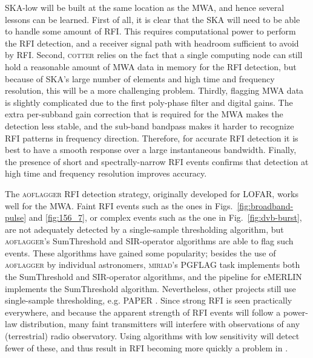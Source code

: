 \documentclass{pasa}
\newcommand{\editmark}[1]{{\color{red}{\textbf{#1}}}}
\begin{document}
SKA-low will be built at the same location as the MWA, and hence several lessons can be learned. First of all, it is clear that the SKA will need to be able to handle some amount of RFI. This requires computational power to perform the RFI detection, and a receiver signal path with headroom sufficient to avoid \editmark{gain compression} by RFI. Second, \textsc{cotter} relies on the fact that a single computing node can still hold a reasonable amount of MWA data in memory for the RFI detection, but because of SKA's large number of elements and high time and frequency resolution, this will be a more challenging problem. Thirdly, flagging MWA data is slightly complicated due to the first poly-phase filter and digital gains. The extra per-subband gain correction that is required for the MWA makes the detection less stable, and the sub-band bandpass makes it harder to recognize RFI patterns in frequency direction. Therefore, for accurate RFI detection it is best to have a smooth response over a large instantaneous bandwidth. Finally, the presence of short and spectrally-narrow RFI events confirms that detection at high time and frequency resolution improves accuracy.

The \textsc{aoflagger} RFI detection strategy, originally developed for LOFAR, works well for the MWA. Faint RFI events such as the ones in Figs.~\ref{fig:broadband-pulse} and \ref{fig:156_7}, or complex events such as the one in Fig.~\ref{fig:dvb-burst}, are not adequately detected by a single-sample thresholding algorithm, but \textsc{aoflagger}'s SumThreshold and SIR-operator algorithms are able to flag such events. These algorithms have gained some popularity; besides the use of \textsc{aoflagger} by individual astronomers, \textsc{miriad}'s PGFLAG task implements both the SumThreshold and SIR-operator algorithms, and the pipeline for eMERLIN \citep{serpent-peck-2013} implements the SumThreshold algorithm. Nevertheless, other projects still use single-sample thresholding, e.g. PAPER \citep{parsons-paper-eorlimit-2014}. Since strong RFI is seen practically everywhere, and because the apparent strength of RFI events will follow a power-law distribution, many faint transmitters will interfere with observations of any (terrestrial) radio observatory. Using algorithms with low sensitivity will detect fewer of these, and thus result in RFI becoming more quickly a problem in \editmark{deep integration projects}.
\end{document}

